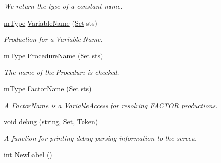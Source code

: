 \begin{DoxyCompactItemize}
\begin{DoxyCompactList}\small\item\em We return the type of a constant name. \item\end{DoxyCompactList}\item 
\hyperlink{blocktable_8h_a636cfca014f3212ea82d45e28f9cb51b}{mType} \hyperlink{classParser_acc9e56bb590b37f7ab87395585d2f2de}{VariableName} (\hyperlink{classSet}{Set} sts)
\begin{DoxyCompactList}\small\item\em Production for a Variable Name. \item\end{DoxyCompactList}\item 
\hyperlink{blocktable_8h_a636cfca014f3212ea82d45e28f9cb51b}{mType} \hyperlink{classParser_a40cd3f4f71c1e5ab0d484679002e55bd}{ProcedureName} (\hyperlink{classSet}{Set} sts)
\begin{DoxyCompactList}\small\item\em The name of the Procedure is checked. \item\end{DoxyCompactList}\item 
\hyperlink{blocktable_8h_a636cfca014f3212ea82d45e28f9cb51b}{mType} \hyperlink{classParser_a7f7f4a0f793d5c31f2a75ea10b426968}{FactorName} (\hyperlink{classSet}{Set} sts)
\begin{DoxyCompactList}\small\item\em A FactorName is a VariableAccess for resolving FACTOR productions. \item\end{DoxyCompactList}\item 
void \hyperlink{classParser_a862ea4d5a0d322471e3183aa4d51ad4b}{debug} (string, \hyperlink{classSet}{Set}, \hyperlink{classToken}{Token})
\begin{DoxyCompactList}\small\item\em A function for printing debug parsing information to the screen. \item\end{DoxyCompactList}\item 
int \hyperlink{classParser_a8f14f036744fbf72a2d3fa1b30f5b334}{NewLabel} ()
\end{DoxyCompactItemize}
